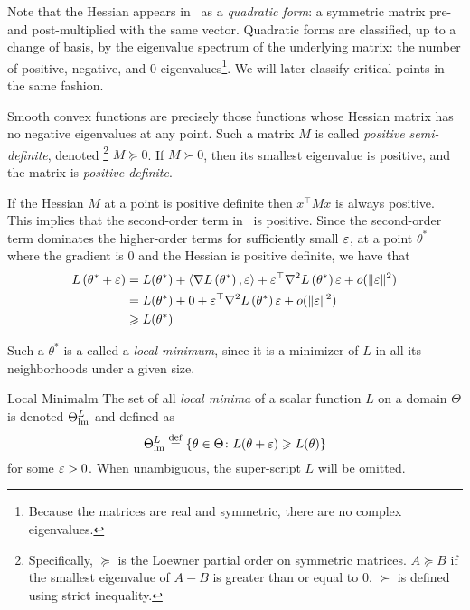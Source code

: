 \documentclass[../../thesis.tex]{subfiles}
\begin{document}
Note that the Hessian appears in~
as a \emph{quadratic form}:
a symmetric matrix pre- and post-multiplied with the same vector.
Quadratic forms are classified,
up to a change of basis, by the eigenvalue spectrum
of the underlying matrix:
the number of positive, negative, and 0 eigenvalues\footnote{%
Because the matrices are real and symmetric,
there are no complex eigenvalues.}.
We will later classify critical points in the same fashion.

Smooth convex functions are precisely those functions whose
Hessian matrix has no negative eigenvalues at any
point.
Such a matrix $M$ is called \emph{positive semi-definite},
denoted%
\footnote{Specifically,
$\succeq$ is the Loewner partial order
on symmetric matrices.
$A \succeq B$ if the smallest eigenvalue
of $A - B$ is greater than or equal to $0$.
$\succ$ is defined using strict inequality.}
$M \succeq 0$.
If $M \succ 0$, then its smallest eigenvalue is positive,
and the matrix is \emph{positive definite}.

If the Hessian $M$ at a point is positive definite
then $x^\top M x$ is always positive.
This implies that the second-order term in~
is positive.
Since the second-order term dominates the higher-order terms
for sufficiently small $\varepsilon$,
at a point $\theta^*$ where the gradient is $0$
and the Hessian is positive definite,
we have that
\begin{align}
	L\left(\theta^* + \varepsilon\right) &=
	L(\theta^*)
	+ \langle\nabla L\left(\theta^*\right),\varepsilon\rangle
	+ \varepsilon^\top\nabla^2L\left(\theta^*\right)\varepsilon + o(\lVert\varepsilon\rVert^2)\\
	&=
	L(\theta^*)
	+ 0
	+ \varepsilon^\top\nabla^2L\left(\theta^*\right)\varepsilon + o(\lVert\varepsilon\rVert^2)\\
	&\geqslant
	L(\theta^*)
\end{align}

Such a $\theta^*$ is a called a \emph{local minimum},
since it is a minimizer of $L$ in all its neighborhoods
under a given size.
\begin{definition}{Local Minima}{lm}
	The set of all \emph{local minima} of a scalar function $L$
	on a domain $\Theta$ is denoted $\Theta^L_{\mathrm{lm}}$ and defined as
	\begin{equation}\equationlabel{def-thetalm}
		\Theta^L_{\lm} \defeq
		\Set{\theta \in \Theta \suchthat L(\theta + \eps) \geq L(\theta)}
	\end{equation}
	for some $\varepsilon > 0$.
	When unambiguous, the super-script $L$ will be omitted.
\end{definition}
\end{document}
